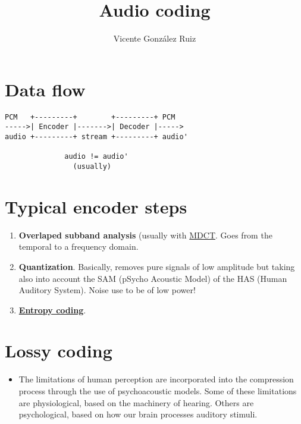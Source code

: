 
\title{Audio coding}

\author{Vicente González Ruiz}

\maketitle

\section{Data flow}

    \begin{verbatim}
PCM   +---------+        +---------+ PCM
----->| Encoder |------->| Decoder |----->
audio +---------+ stream +---------+ audio'

              audio != audio'
                (usually)
\end{verbatim}

\section{Typical encoder steps}
\begin{enumerate}
\def\labelenumi{\arabic{enumi}.}
\item
  \textbf{Overlaped subband analysis} (usually with
  \href{http://en.wikipedia.org/wiki/Modified_discrete_cosine_transform\%7D\%20(Modified\%20Discrete\%20Cosine\%20Transform)}{MDCT}.
  Goes from the temporal to a frequency domain.
\item
  \textbf{Quantization}. Basically, removes pure signals of low
  amplitude but taking also into account the SAM (pSycho Acoustic Model)
  of the HAS (Human Auditory System). Noise use to be of low power!
\item
  \href{https://vicente-gonzalez-ruiz.github.io/text_compression/}{\textbf{Entropy
  coding}}.
\end{enumerate}

\section{Lossy coding}
\begin{itemize}
\tightlist
\item
  The limitations of human perception are incorporated into the
  compression process through the use of psychoacoustic models. Some of
  these limitations are physiological, based on the machinery of
  hearing. Others are psychological, based on how our brain processes
  auditory stimuli.
\end{itemize}


